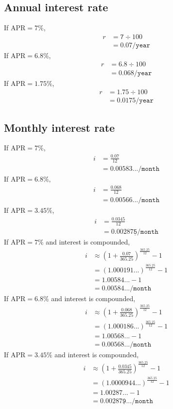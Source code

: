 \documentclass[12pt,letterpaper,oneside]{article}
\theoremstyle{remark} %
\begin{document}
	\subsection{Annual interest rate}
	If $\mbox{APR}=7\%$,
	\begin{align*}
	r&=\mathtt{7}\div 100\\
	&=\mathtt{0.07/year}
	\end{align*}
	If $\mbox{APR}=6.8\%$,
	\begin{align*}
	r&=\mathtt{6.8}\div 100\\
	&=\mathtt{0.068/year}
	\end{align*}
	If $\mbox{APR}=1.75\%$,
	\begin{align*}
	r&=\mathtt{1.75}\div 100\\
	&=\mathtt{0.0175/year}
	\end{align*}

	\subsection{Monthly interest rate}
	If $\mbox{APR}=7\%$,
	\begin{align*}
	i&=\frac{\mathtt{0.07}}{12}\\
	&=\mathtt{0.00583.../month}
	\end{align*}
	If $\mbox{APR}=6.8\%$,
	\begin{align*}
	i&=\frac{\mathtt{0.068}}{12}\\
	&=\mathtt{0.00566.../month}
	\end{align*}
	If $\mbox{APR}=3.45\%$,
	\begin{align*}
	i&=\frac{\mathtt{0.0345}}{12}\\
	&=\mathtt{0.00287\underline{5}/month}
	\end{align*}
	\newpage
	\setlength\parindent{0pt} If $\mbox{APR}=7\%$ and interest is compounded,
	\begin{align*}
	i&\approx\left(1+\frac{\mathtt{0.07}}{365.25}\right)^{\frac{365.25}{12}}-1\\
	&=\left(\mathtt{1.000191...}\right)^{\frac{365.25}{12}}-1\\
	&=\mathtt{1.00584...}-1\\
	&=\mathtt{0.00584.../month}
	\end{align*}
	If $\mbox{APR}=6.8\%$ and interest is compounded,
	\begin{align*}
	i&\approx\left(1+\frac{\mathtt{0.068}}{365.25}\right)^{\frac{365.25}{12}}-1\\
	&=\left(\mathtt{1.000186...}\right)^{\frac{365.25}{12}}-1\\
	&=\mathtt{1.00568...}-1\\
	&=\mathtt{0.00568.../month}
	\end{align*}
	If $\mbox{APR}=3.45\%$ and interest is compounded,
	\begin{align*}
	i&\approx\left(1+\frac{\mathtt{0.0345}}{365.25}\right)^{\frac{365.25}{12}}-1\\
	&=\left(\mathtt{1.0000944...}\right)^{\frac{365.25}{12}}-1\\
	&=\mathtt{1.00287...}-1\\
	&=\mathtt{0.00287\underline{9}.../month}
	\end{align*}
\end{document}
